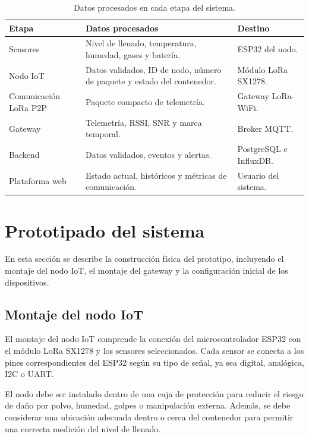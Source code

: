 \begin{table}[H]
\centering
\caption{Datos procesados en cada etapa del sistema.}
\label{tab:flujo_datos_sistema}
\small
\renewcommand{\arraystretch}{1.2}
\begin{tabularx}{\linewidth}{
>{\raggedright\arraybackslash}p{3.5cm}
>{\raggedright\arraybackslash}X
>{\raggedright\arraybackslash}p{3.6cm}}
\toprule
\textbf{Etapa} & \textbf{Datos procesados} & \textbf{Destino} \\
\midrule
Sensores
& Nivel de llenado, temperatura, humedad, gases y batería.
& ESP32 del nodo. \\

Nodo IoT
& Datos validados, ID de nodo, número de paquete y estado del contenedor.
& Módulo LoRa SX1278. \\

Comunicación LoRa P2P
& Paquete compacto de telemetría.
& Gateway LoRa-WiFi. \\

Gateway
& Telemetría, RSSI, SNR y marca temporal.
& Broker MQTT. \\

Backend
& Datos validados, eventos y alertas.
& PostgreSQL e InfluxDB. \\

Plataforma web
& Estado actual, históricos y métricas de comunicación.
& Usuario del sistema. \\
\bottomrule
\end{tabularx}
\end{table}
\section{Prototipado del sistema}

En esta sección se describe la construcción física del prototipo, incluyendo el montaje del nodo IoT, el montaje del gateway y la configuración inicial de los dispositivos.

\subsection{Montaje del nodo IoT}

El montaje del nodo IoT comprende la conexión del microcontrolador ESP32 con el módulo LoRa SX1278 y los sensores seleccionados. Cada sensor se conecta a los pines correspondientes del ESP32 según su tipo de señal, ya sea digital, analógica, I2C o UART.

El nodo debe ser instalado dentro de una caja de protección para reducir el riesgo de daño por polvo, humedad, golpes o manipulación externa. Además, se debe considerar una ubicación adecuada dentro o cerca del contenedor para permitir una correcta medición del nivel de llenado.

